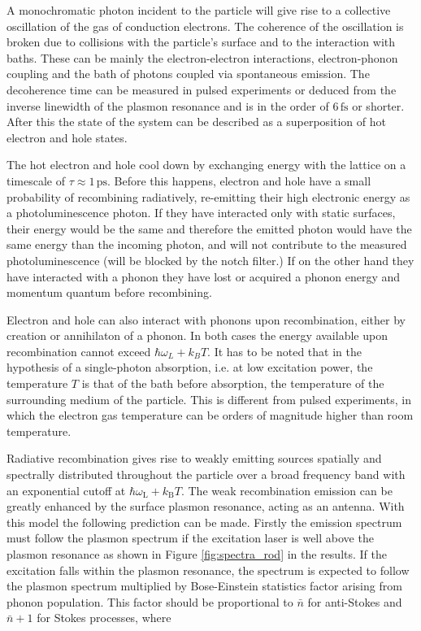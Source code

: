 \documentclass[journal=nalefd,manuscript=letter]{achemso}
\newcommand{\fs}{\ensuremath{\,\textrm{fs}}}
\newcommand{\ps}{\ensuremath{\,\textrm{ps}}}
\begin{document}
A monochromatic photon incident to the particle will give rise to a collective
oscillation of the gas of conduction electrons. The coherence of the oscillation
is broken due to collisions with the particle's surface and to the interaction
with baths\cite{Zhao2016,Sonnichsen2002}. These can be mainly the
electron-electron interactions, electron-phonon coupling and the bath of photons
coupled via spontaneous emission. The decoherence time can be measured in pulsed
experiments or deduced from the inverse linewidth of the plasmon resonance and
is in the order of $6\fs$ or shorter\cite{Sun1994}. After this the state of the
system can be described as a superposition of hot electron and hole states.

The hot electron and hole cool down by exchanging energy with the lattice on a
timescale of $\tau\approx1\ps$\cite{Pustovalov2005}. Before this happens,
electron and hole have a small probability of recombining radiatively,
re-emitting their high electronic energy as a photoluminescence photon. If they
have interacted only with static surfaces, their energy would be the same and
therefore the emitted photon would have the same energy than the incoming
photon, and will not contribute to the measured photoluminescence (will be
blocked by the notch filter.) If on the other hand they have interacted with a
phonon they have lost or acquired a phonon energy and momentum quantum before
recombining.

Electron and hole can also interact with phonons upon recombination, either by
creation or annihilaton of a phonon. In both cases the energy available upon
recombination cannot exceed $\hbar\omega_L+k_BT$. It has to be noted that in the
hypothesis of a single-photon absorption, i.e. at low excitation power, the
temperature $T$ is that of the bath before absorption, the temperature of the
surrounding medium of the particle. This is different from pulsed experiments,
in which the electron gas temperature can be orders of magnitude higher than
room temperature\cite{Baffou2013a}. 

Radiative recombination gives rise to weakly emitting sources spatially and
spectrally distributed throughout the particle over a broad frequency band with
an exponential cutoff at $\hbar\omega_\textrm{L}+k_\textrm{B}T$. The weak
recombination emission can be greatly enhanced by the surface plasmon resonance,
acting as an antenna. With this model the following prediction can be made.
Firstly the emission spectrum must follow the plasmon spectrum if the excitation
laser is well above the plasmon resonance as shown in Figure
\ref{fig:spectra_rod} in the results. If the excitation falls within the
plasmon resonance, the spectrum is expected to follow the plasmon spectrum multiplied by
Bose-Einstein statistics factor arising from phonon population.
This factor should be proportional to $\bar{n}$ for anti-Stokes and $\bar{n}+1$
for Stokes processes, where
\end{document}
